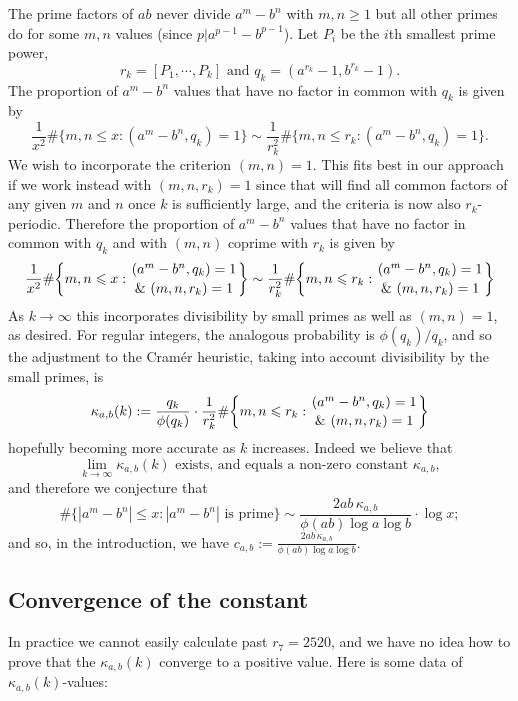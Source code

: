 \documentclass[12pt, a4paper,  reqno, english]{amsart}%
\numberwithin{equation}{section}
\theoremstyle{definition}
\renewcommand{\leq}{\leqslant}
\renewcommand{\geq}{\geqslant}
\begin{document}
The prime factors of $ab$ never divide $a^m-b^n$ with $m,n\geq 1$ but all other primes do for some $m,n$ values (since $p|a^{p-1}-b^{p-1}$).
Let $P_i$ be the $i$th smallest prime power,
\[
r_k=[P_1,\cdots,P_k] \text{ and } q_k=(a^{r_k}-1, b^{r_k}-1).
\]
The proportion of $a^m-b^n$ values that have no factor in common with $q_k$ is given by
\[
\frac 1{x^2} \#\{ m,n\leq x: (a^m-b^n,q_k)=1\} \sim \frac 1{r_k^2} \#\{ m,n\leq r_k: (a^m-b^n,q_k)=1\} .
\]
We wish to incorporate the criterion $(m,n)=1$.   This fits best in our approach if we work instead with $(m,n,r_k)=1$ since that will find all common factors of any given $m$ and $n$ once $k$ is sufficiently large, and the criteria is now also  $r_k$-periodic. Therefore
the proportion of $a^m-b^n$ values that have no factor in common with $q_k$ and with $(m,n)$ coprime with $r_k$   is given by
\[
\frac 1{x^2} \#\bigg\{ m,n\leq x: {(a^m-b^n,q_k)=1\above 0pt \& \  (m,n,r_k)=1}\bigg\} \sim
\frac 1{r_k^2} \#\bigg\{ m,n\leq r_k: {(a^m-b^n,q_k)=1\above 0pt \& \  (m,n,r_k)=1}\bigg\} 
\]
As $k\to \infty$ this incorporates divisibility by small primes as well as $(m,n)=1$, as desired.
For regular integers, the analogous probability is $\phi(q_k)/q_k$, and so the adjustment to the Cram\'er heuristic, taking into account divisibility by the small primes, is 
\[
 \kappa_{a,b}(k) :=\frac {q_k}{\phi(q_k)} \cdot \frac 1{r_k^2} \#\bigg\{ m,n\leq r_k: {(a^m-b^n,q_k)=1\above 0pt \& \  (m,n,r_k)=1}\bigg\} \]
 hopefully becoming more accurate as $k$ increases.
Indeed we believe that 
\[
\lim_{k\to \infty} \kappa_{a,b}(k) \text{ exists, and equals a non-zero constant } \kappa_{a,b},
\]
and therefore we conjecture that 
 \[
 \boxed{ \#\{ |a^m-b^n|\leq x: |a^m-b^n| \text{ is prime}\} \sim  \frac{2ab\, \kappa_{a,b}}{\phi(ab)\log a\log b}\cdot \log x;}
 \]
and so, in the introduction, we have  $c_{a,b}:= \frac{2ab\, \kappa_{a,b}}{\phi(ab)\log a\log b}$.
 
  
 
\subsection{Convergence of the constant}
In practice we cannot easily calculate past $r_7=2520$, and we have no idea how to prove that the $\kappa_{a,b}(k)$ converge   to a positive value. Here is some data of $\kappa_{a,b}(k)$-values:
\end{document}
